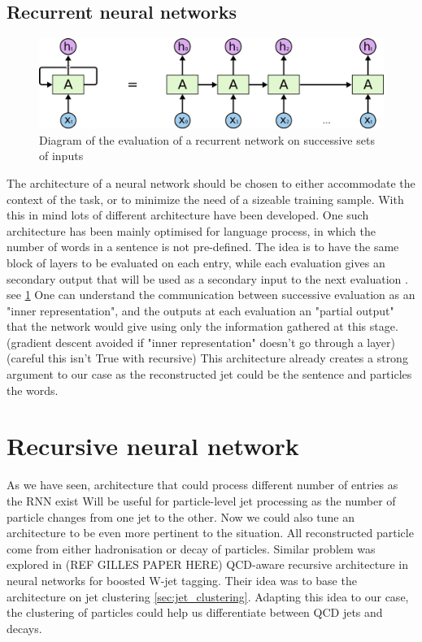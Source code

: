 \subsection{Recurrent neural networks}

\begin{figure}
    \centering
    \includegraphics[width=\textwidth]{Images/recurrent_network.png}
    \caption{Diagram of the evaluation of a recurrent network on successive sets of inputs}
    \label{fig:recurrent_network}
\end{figure}

The architecture of a neural network should be chosen to either accommodate the context of the task, or to minimize the need of a sizeable training sample.
With this in mind lots of different architecture have been developed.
One such architecture has been mainly optimised for language process, in which the number of words in a sentence is not pre-defined.
The idea is to have the same block of layers to be evaluated on each entry, while each evaluation gives an secondary output that will be used as a secondary input to the next evaluation . see \ref{fig:recurrent_network}
One can understand the communication between successive evaluation as an "inner representation", and the outputs at each evaluation an "partial output" that the network would give using only the information gathered at this stage.
(gradient descent avoided if "inner representation" doesn't go through a layer) (careful this isn't True with recursive)
This architecture already creates a strong argument to our case as the reconstructed jet could be the sentence and particles the words.

\section{Recursive neural network}
\label{sec:RecNN}
As we have seen, architecture that could process different number of entries as the RNN exist
Will be useful for particle-level jet processing as the number of particle changes from one jet to the other.
Now we could also tune an architecture to be even more pertinent to the situation.
All reconstructed particle come from either hadronisation or decay of particles.
Similar problem was explored in (REF GILLES PAPER HERE) QCD-aware recursive architecture in neural networks for boosted W-jet tagging. Their idea was to base the architecture on jet clustering \ref{sec:jet_clustering}.
Adapting this idea to our case, the clustering of particles could help us differentiate between QCD jets and \tauh decays.

